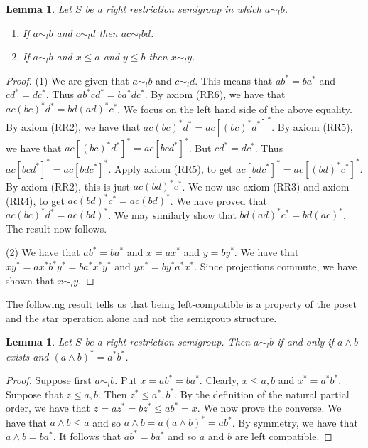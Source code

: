 \documentclass[a4paper]{amsart}
\newtheorem{lemma}[theorem]{Lemma}
\begin{document}
\begin{lemma}\label{lem:similarity} 
Let $S$ be a right restriction semigroup in which $a \sim_{l} b$.
\begin{enumerate}
\item If $a \sim_{l} b$ and $c \sim_{l} d$ then $ac \sim_{l} bd$. 
\item If $a \sim_{l} b$ and $x \leq a$ and $y \leq b$ then $x \sim_{l} y$. 
\end{enumerate}
\end{lemma}
\begin{proof} (1) We are given that $a \sim_{l} b$ and $c \sim_{l} d$.
This means that $ab^{\ast} = ba^{\ast}$ and $cd^{\ast} = dc^{\ast}$.
Thus $ab^{\ast}cd^{\ast} = ba^{\ast}dc^{\ast}$.
By axiom (RR6), we have that
$ac(bc)^{\ast}d^{\ast} = bd(ad)^{\ast}c^{\ast}$.
We focus on the left hand side of the above equality.
By axiom (RR2), we have that $ac(bc)^{\ast}d^{\ast} = ac [(bc)^{\ast}d^{\ast}]^{\ast}$.
By axiom (RR5), we have that $ac [(bc)^{\ast}d^{\ast}]^{\ast} = ac[bcd^{\ast}]^{\ast}$.
But $cd^{\ast} = dc^{\ast}$.
Thus $ac[bcd^{\ast}]^{\ast} =  ac[bdc^{\ast}]^{\ast}$.
Apply axiom (RR5), to get $ac[bdc^{\ast}]^{\ast} = ac[(bd)^{\ast}c^{\ast}]^{\ast}$.
By axiom (RR2), this is just  $ac(bd)^{\ast}c^{\ast}$.
We now use axiom (RR3) and axiom (RR4), to get $ac(bd)^{\ast}c^{\ast} = ac (bd)^{\ast}$.
We have proved that $ac(bc)^{\ast}d^{\ast} = ac (bd)^{\ast}$.
We may similarly show that $bd(ad)^{\ast}c^{\ast} = bd(ac)^{\ast}$.
The result now follows.

(2) We have that $ab^{\ast} = ba^{\ast}$ and $x = ax^{\ast}$ and $y = by^{\ast}$.
We have that 
$xy^{\ast} = ax^{\ast}b^{\ast}y^{\ast} = ba^{\ast}x^{\ast}y^{\ast}$
and
$yx^{\ast} = by^{\ast}a^{\ast}x^{\ast}$.
Since projections commute, we have shown that $x \sim_{l} y$.
\end{proof}


The following result tells us that being left-compatible is a property of the poset 
and the star operation alone and not the semigroup structure.

\begin{lemma}\label{lem:meets} Let $S$ be a right restriction semigroup. 
Then $a \sim_{l} b$ if and only if $a \wedge b$ exists and $(a \wedge b)^{\ast} = a^{\ast}b^{\ast}$.
\end{lemma}
\begin{proof} Suppose first $a \sim_{l} b$.
Put $x = ab^{\ast} = ba^{\ast}$.
Clearly, $x \leq a,b$ and $x^{\ast} = a^{\ast}b^{\ast}$.
Suppose that $z \leq a,b$.
Then $z^{\ast} \leq a^{\ast}, b^{\ast}$.
By the definition of the natural partial order,
we have that $z = az^{\ast} = bz^{\ast} \leq ab^{\ast} = x$.
We now prove the converse.
We have that $a \wedge b \leq a$ and so $a \wedge b = a(a \wedge b)^{\ast} = ab^{\ast}$.
By symmetry, we have that $a \wedge b = ba^{\ast}$.
It follows that $ab^{\ast} = ba^{\ast}$ and so $a$ and $b$ are left compatible.
\end{proof}
\end{document}
